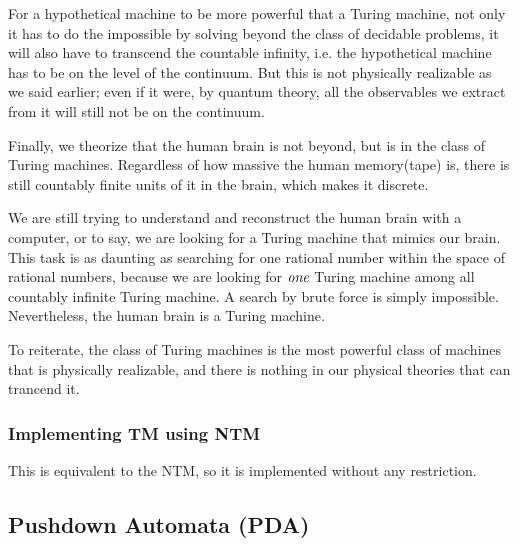 \documentclass[12pt]{article}  %
\begin{document}
For a hypothetical machine to be more powerful that a Turing machine, not only it has to do the impossible by solving beyond the class of decidable problems, it will also have to transcend the countable infinity, i.e. the hypothetical machine has to be on the level of the continuum. But this is not physically realizable as we said earlier; even if it were, by quantum theory, all the observables we extract from it will still not be on the continuum.

Finally, we theorize that the human brain is not beyond, but is in the class of Turing machines. Regardless of how massive the human memory(tape) is, there is still countably finite units of it in the brain, which makes it discrete. 

We are still trying to understand and reconstruct the human brain with a computer, or to say, we are looking for a Turing machine that mimics our brain. This task is as daunting as searching for one rational number within the space of rational numbers, because we are looking for $\emph{one}$ Turing machine among all countably infinite Turing machine. A search by brute force is simply impossible. Nevertheless, the human brain is a Turing machine.

To reiterate, the class of Turing machines is the most powerful class of machines that is physically realizable, and there is nothing in our physical theories that can trancend it.




\subsubsection{Implementing TM using NTM}
This is equivalent to the NTM, so it is implemented without any restriction.





\subsection{Pushdown Automata (PDA)}
\end{document}

